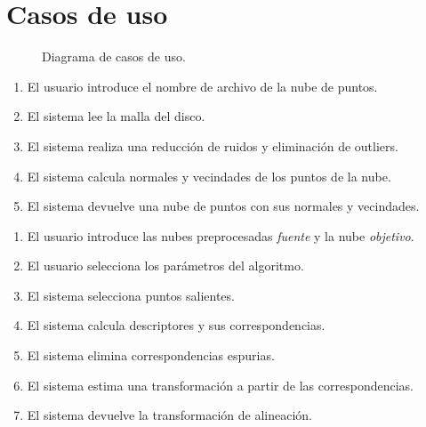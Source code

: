 \chapter{Casos de uso}

\begin{figure}[h]
	\centering
\begin{scaletikzpicturetowidth}{\linewidth}
	
\end{scaletikzpicturetowidth}
	\caption{\label{fig:casos_de_uso}Diagrama de casos de uso.}
\end{figure}

		\CUNormal
		\begin{enumerate}
			\item El usuario introduce el nombre de archivo de la nube de puntos.
			\item El sistema lee la malla del disco.
			\item El sistema realiza una reducción de ruidos y eliminación de outliers.
			\item El sistema calcula normales y vecindades de los puntos de la nube.
			\item El sistema devuelve una nube de puntos con sus normales y vecindades.
		\end{enumerate}

		\CUNormal
		\begin{enumerate}
			\item El usuario introduce las nubes preprocesadas \emph{fuente} y la nube \emph{objetivo}. 
			\item El usuario selecciona los parámetros del algoritmo.
			\item El sistema selecciona puntos salientes.
			\item El sistema calcula descriptores y sus correspondencias.
			\item El sistema elimina correspondencias espurias.
			\item El sistema estima una transformación a partir de las correspondencias.
			\item El sistema devuelve la transformación de alineación.
		\end{enumerate}

